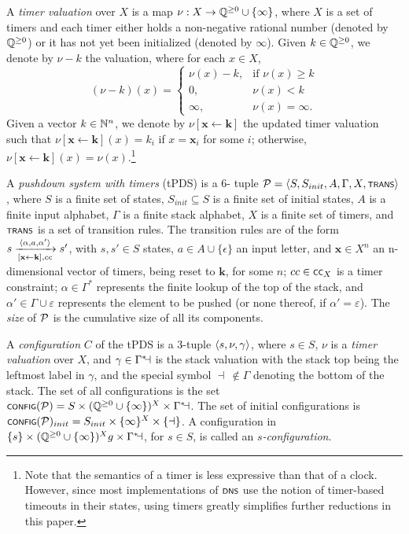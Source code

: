 A \emph{timer valuation} over $X$ is a map $\nu : X \rightarrow \rat^{\geq 0} \cup \{\infty\}$, where $X$ is a set of timers and each timer either holds a non-negative rational number (denoted by $\rat^{\geq 0}$) or it has not yet been initialized (denoted by $\infty$). Given $k \in \rat^{\geq 0}$, we denote by $\nu - k$ the valuation, where for each $x\in X$, 
\[(\nu - k)(x) = \begin{cases}
	\nu(x) - k, & \text{if } \nu(x) \geq k\\
	0, & \nu(x) < k\\
	\infty, & \nu(x) = \infty.
\end{cases}\]
Given a vector $k \in \nat^n$, we denote by $\nu[\mathbf{x} \leftarrow \mathbf{k}]$ the updated timer valuation such that $\nu[\mathbf{x} \leftarrow \mathbf{k}](x) = k_i$ if $x = \mathbf{x}_i$ for some $i$; otherwise, $\nu[\mathbf{x} \leftarrow \mathbf{k}](x) = \nu(x)$.\footnote{Note that the semantics of a timer is less expressive than that of a clock. However, since most implementations of $\scrsf{dns}$ use the notion of timer-based timeouts in their states, using timers greatly simplifies further reductions in this paper.}

\begin{definition}\label{def:tpds}
	A \emph{pushdown system with timers} (tPDS) is a 6- tuple $\cal P = \tup{S,S_{init},A,\Gamma,X,\trans}$, where $S$ is a finite set of states, $S_{init} \subseteq S$ is a finite set of initial states, $A$ is a finite input alphabet, $\Gamma$ is a finite stack alphabet, $X$ is a finite set of timers, and $\trans$ is a set of transition rules. The transition rules are of the form $s \xrightarrow[{[\mathbf{x} \leftarrow \mathbf{k}]},cc]{\tup{\alpha,a,\alpha'}} s'$, with $s,s' \in S$ states, $a \in A \cup \{\epsilon\}$ an input letter, and $\mathbf{x} \in X^n$ an n-dimensional vector of timers, being reset to $\mathbf{k}$, for some $n$; $cc \in \scrsf{cc}_X$ is a timer constraint; $\alpha\in \Gamma^*$ represents the finite lookup of the top of the stack, and $\alpha'\in \Gamma\cup \varepsilon$ represents the element to be pushed (or none thereof, if $\alpha' = \varepsilon$). The \emph{size} of $\cal P$ is the cumulative size of all its components.
\end{definition}

A \emph{configuration} $C$ of the tPDS is a 3-tuple $\tup{s,\nu,\gamma}$, where $s\in S$, $\nu$ is a \emph{timer valuation} over $X$, and $\gamma \in \Gamma^*\bottom$ is the stack valuation with the stack top being the leftmost label in $\gamma$, and the special symbol $\dashv\,\notin \Gamma$ denoting the bottom of the stack. The set of all configurations is the set $\config{\cal P} = S\times (\rat^{\geq 0} \cup \{\infty\})^X \times \Gamma^*\bottom$. The set of initial configurations is $\config{\cal P}_{init} = S_{init}\times \{\infty\}^{X} \times\{\dashv\}$. A configuration in $\{s\} \times (\rat^{\geq 0} \cup \{\infty\})^Xg \times \Gamma^*\bottom$, for $s \in S$, is called an $s$\emph{-configuration}.

